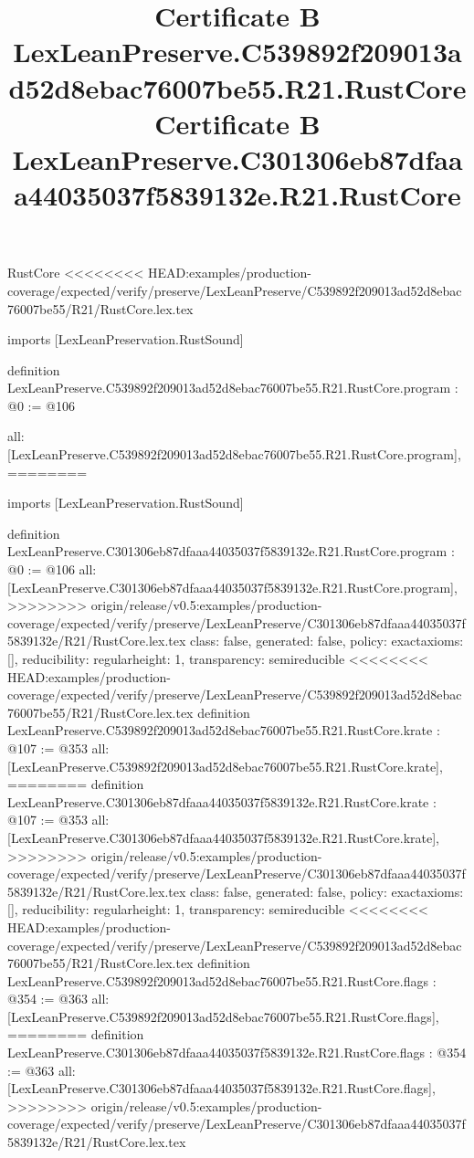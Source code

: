 \begin{lexlean}{RustCore}
<<<<<<<< HEAD:examples/production-coverage/expected/verify/preserve/LexLeanPreserve/C539892f209013ad52d8ebac76007be55/R21/RustCore.lex.tex
\title{Certificate B LexLeanPreserve.C539892f209013ad52d8ebac76007be55.R21.RustCore}
\begin{coremodule}
imports [LexLeanPreservation.RustSound]

definition LexLeanPreserve.C539892f209013ad52d8ebac76007be55.R21.RustCore.program : @0 := @106 {
  all: [LexLeanPreserve.C539892f209013ad52d8ebac76007be55.R21.RustCore.program],
========
\title{Certificate B LexLeanPreserve.C301306eb87dfaaa44035037f5839132e.R21.RustCore}
\begin{coremodule}
imports [LexLeanPreservation.RustSound]

definition LexLeanPreserve.C301306eb87dfaaa44035037f5839132e.R21.RustCore.program : @0 := @106 {
  all: [LexLeanPreserve.C301306eb87dfaaa44035037f5839132e.R21.RustCore.program],
>>>>>>>> origin/release/v0.5:examples/production-coverage/expected/verify/preserve/LexLeanPreserve/C301306eb87dfaaa44035037f5839132e/R21/RustCore.lex.tex
  class: false,
  generated: false,
  policy: exact{axioms: []},
  reducibility: regular{height: 1},
  transparency: semireducible
}
<<<<<<<< HEAD:examples/production-coverage/expected/verify/preserve/LexLeanPreserve/C539892f209013ad52d8ebac76007be55/R21/RustCore.lex.tex
definition LexLeanPreserve.C539892f209013ad52d8ebac76007be55.R21.RustCore.krate : @107 := @353 {
  all: [LexLeanPreserve.C539892f209013ad52d8ebac76007be55.R21.RustCore.krate],
========
definition LexLeanPreserve.C301306eb87dfaaa44035037f5839132e.R21.RustCore.krate : @107 := @353 {
  all: [LexLeanPreserve.C301306eb87dfaaa44035037f5839132e.R21.RustCore.krate],
>>>>>>>> origin/release/v0.5:examples/production-coverage/expected/verify/preserve/LexLeanPreserve/C301306eb87dfaaa44035037f5839132e/R21/RustCore.lex.tex
  class: false,
  generated: false,
  policy: exact{axioms: []},
  reducibility: regular{height: 1},
  transparency: semireducible
}
<<<<<<<< HEAD:examples/production-coverage/expected/verify/preserve/LexLeanPreserve/C539892f209013ad52d8ebac76007be55/R21/RustCore.lex.tex
definition LexLeanPreserve.C539892f209013ad52d8ebac76007be55.R21.RustCore.flags : @354 := @363 {
  all: [LexLeanPreserve.C539892f209013ad52d8ebac76007be55.R21.RustCore.flags],
========
definition LexLeanPreserve.C301306eb87dfaaa44035037f5839132e.R21.RustCore.flags : @354 := @363 {
  all: [LexLeanPreserve.C301306eb87dfaaa44035037f5839132e.R21.RustCore.flags],
>>>>>>>> origin/release/v0.5:examples/production-coverage/expected/verify/preserve/LexLeanPreserve/C301306eb87dfaaa44035037f5839132e/R21/RustCore.lex.tex
}}}
\end{coremodule}}
\end{coremodule}
\end{lexlean}
